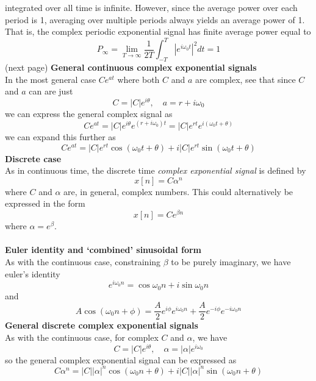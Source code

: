 \documentclass{report}
\begin{document}
integrated over all time is infinite.
However, since the average power over each period is 1, averaging over multiple periods always yields an average
power of 1. That is, the complex periodic exponential
signal has finite average power equal to
\begin{equation*}
P_\infty=\lim_{T\to\infty}\frac{1}{2T}\int^T_{-T}|e^{i\omega_0t}|^2dt=1
\end{equation*}
(next page)\newpage
\noindent\textbf{General continuous complex exponential signals}\\
In the most general case $Ce^{at}$ where both $C$ and $a$ are complex, see that since $C$ and $a$ can are just
\begin{equation*}
C=|C|e^{i\theta},\quad a=r+i\omega_0
\end{equation*}
we can express the general complex signal as
\begin{equation*}
Ce^{at}=|C|e^{i\theta}e^{(r+i\omega_0)t}=|C|e^{rt}e^{i(\omega_0t+\theta)}
\end{equation*}
we can expand this further as
\begin{equation*}
Ce^{at}=|C|e^{rt}\cos(\omega_0t+\theta)+i|C|e^{rt}\sin(\omega_0t+\theta)
\end{equation*}
\textbf{Discrete case}\\
As in continuous time, the discrete time \textit{complex exponential signal} is defined by
\begin{equation*}
x[n]=C\alpha^n
\end{equation*}
where $C$ and $\alpha$ are, in general, complex numbers. This could alternatively be expressed in the form
\begin{equation*}
x[n]=Ce^{\beta n}
\end{equation*}
where $\alpha=e^{\beta}$.\\
\vspace{1mm}\\
\textbf{Euler identity and `combined' sinusoidal form}\\
As with the continuous case, constraining $\beta$ to be
purely imaginary, we have euler's identity
\begin{equation*}
e^{i\omega_0n}=\cos\omega_0n+i\sin\omega_0n
\end{equation*}
and 
\begin{equation*}
A\cos(\omega_0n+\phi)=\frac{A}{2}e^{i\phi}e^{i\omega_0n}+
\frac{A}{2}e^{-i\phi}e^{-i\omega_0n}
\end{equation*}
\textbf{General discrete complex exponential signals}\\
As with the continuous case, for complex $C$ and $\alpha$, we have
\begin{equation*}
C=|C|e^{i\theta},\quad\alpha=|\alpha|e^{i\omega_0}
\end{equation*}
so the general complex exponential signal can be expressed as
\begin{equation*}
C\alpha^n=|C||\alpha|^n\cos(\omega_0n+\theta)
+i|C||\alpha|^n\sin(\omega_0n+\theta)
\end{equation*}
\newpage
\end{document}
